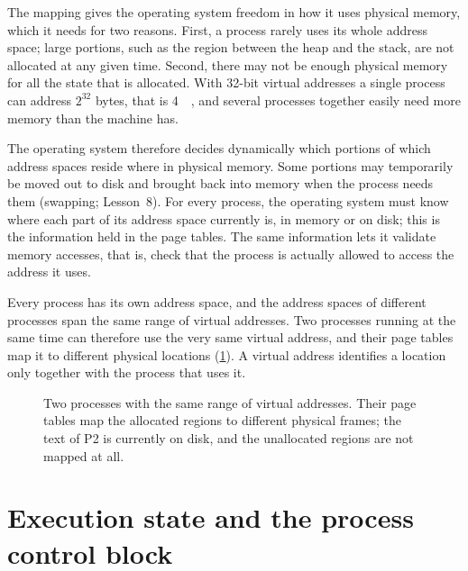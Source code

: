 \documentclass[../main.tex]{subfiles}
\begin{document}
The mapping gives the operating system freedom in how it uses physical
memory, which it needs for two reasons.  First, a process rarely uses its whole address space;
large portions, such as the region between the heap and the stack, are not
allocated at any given time.  Second, there may not be enough physical
memory for all the state that is allocated.  With 32-bit virtual addresses a single process
can address $2^{32}$ bytes, that is \SI{4}{\gibi\byte}, and several processes
together easily need more memory than the machine has.

The operating system therefore decides dynamically which portions of which
address spaces reside where in physical memory.  Some portions may
temporarily be moved out to disk and brought back into memory when the
process needs them (swapping; Lesson~8).  For every process, the operating
system must know where each part of its address space currently is, in
memory or on disk; this is the information held in the page tables.  The
same information lets it validate memory accesses, that is, check that the
process is actually allowed to access the address it uses.

Every process has its own address space, and the address spaces of
different processes span the same range of virtual addresses.  Two processes
running at the same time can therefore use the very same virtual address,
and their page tables map it to different physical locations
(\cref{fig:l02-address-mapping}).  A virtual address identifies a location
only together with the process that uses it.

\begin{figure}[htbp]
  \centering
  
  \caption{Two processes with the same range of virtual addresses.  Their
    page tables map the allocated regions to different physical frames; the
    text of P2 is currently on disk, and the unallocated regions are not
    mapped at all.}
  \label{fig:l02-address-mapping}
\end{figure}

\section{Execution state and the process control block}
\label{sec:l02-pcb}
\end{document}

